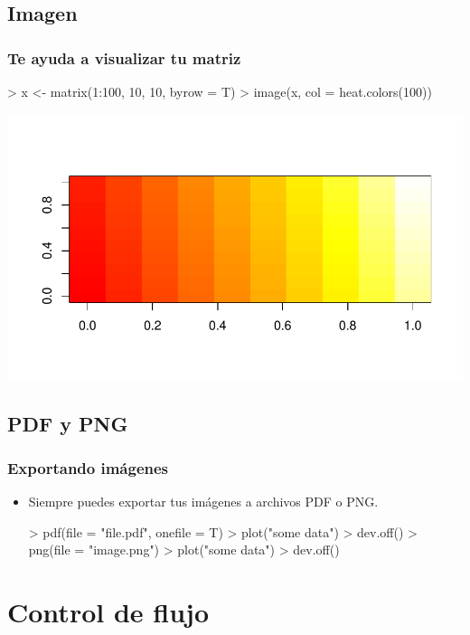 \subsection{Imagen}

\begin{frame}
  \frametitle{Te ayuda a visualizar tu matriz}
\begin{Schunk}
\begin{Sinput}
> x <- matrix(1:100, 10, 10, byrow = T)
> image(x, col = heat.colors(100))
\end{Sinput}
\end{Schunk}
\includegraphics{plots/figura-031}
\end{frame}

\subsection{PDF y PNG}

\begin{frame}
  \frametitle{Exportando im\'agenes}
  \begin{itemize}
  \item Siempre puedes exportar tus im\'agenes a archivos PDF o PNG.
\begin{Schunk}
\begin{Sinput}
> pdf(file = "file.pdf", onefile = T)
> plot("some data")
> dev.off()
> png(file = "image.png")
> plot("some data")
> dev.off()
\end{Sinput}
\end{Schunk}
  \end{itemize}
\end{frame}


\section{Control de flujo}

